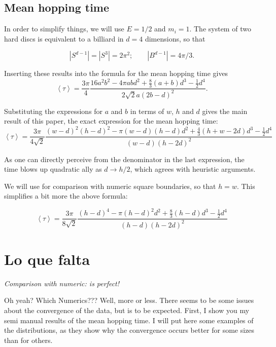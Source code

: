 \documentclass[a4paper,10pt]{article}
\newcommand{\mean}[1]{\left \langle #1 \right \rangle}
\begin{document}
\subsection{Mean hopping time}

In order to simplify things, we will use $E=1/2$ and $m_i=1$.
The system of two hard discs is equivalent to a billiard in $d=4$ dimensions, so that

\begin{equation}
 |S^{d-1}| = |S^3| = 2 \pi^2; \qquad |B^{d-1}| = 4 \pi / 3.
\end{equation}

Inserting these results into the formula for the mean hopping time gives
\begin{equation}
 \mean{\tau} = 	
\frac{3 \pi}{4}
\frac
{16 a^{2} b^{2}  - 4 \pi a b d^{2} + \textstyle \frac{8}{3} (a+b) d^{3}  - \frac{1}{2} d^{4}}
{ 2 \sqrt{2} a ( 2b - d )^2}.
\end{equation}

Substituting the expressions for $a$ and $b$ in terms of $w$, $h$ and $d$ gives
the main result of this paper, the exact expression for the mean hopping time:
\begin{equation}\label{hoptimegeneral}
 \mean{\tau} = \frac{3 \pi}{4 \sqrt{2}}
\frac{(w-d)^2(h-d)^2-\pi(w-d)(h-d)d^2+\frac{4}{3}(h+w-2d)d^3-\frac{1}{2}d^4}
{(w-d)(h-2d)^2}
\end{equation}

As one can directly perceive from the denominator in the last expression, the
time blows up quadratic ally as $d\rightarrow h/2$, which agrees
with heuristic arguments. 

We will use for comparison with numeric square boundaries, 
so that $h=w$. This simplifies a bit more the above 
formula:

\begin{equation}\label{hoptimesquare}
 \mean{\tau} =\frac{3\pi}{8\sqrt{2}} 
\frac{(h-d)^4-\pi(h-d)^2d^2+\frac{8}{3}(h-d)d^3-\frac{1}{2}d^4}
{(h-d)(h-2d)^2}
\end{equation}



\section{Lo que falta}

\emph{Comparison with numeric: is perfect!}

Oh yeah? Which Numerics???
Well, more or less. There seems to be some issues about the convergence of the
data, but is to be expected. First, I show you my semi manual results of
the mean hopping time. I will put here some examples of the
distributions, as they show why the convergence occurs better for some
sizes than for others.
\end{document}

